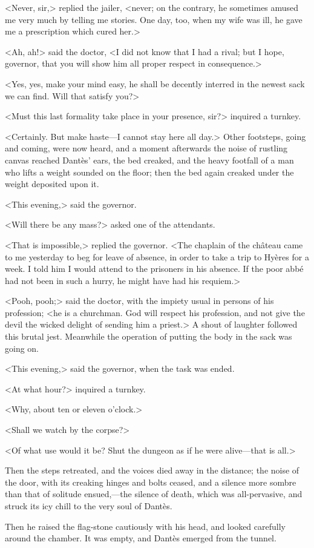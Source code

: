  <Never, sir,> replied the jailer, <never; on the contrary, he sometimes amused me very much by telling me stories. One day, too, when my wife was ill, he gave me a prescription which cured her.> 

 <Ah, ah!> said the doctor, <I did not know that I had a rival; but I hope, governor, that you will show him all proper respect in consequence.> 

 <Yes, yes, make your mind easy, he shall be decently interred in the newest sack we can find. Will that satisfy you?> 

 <Must this last formality take place in your presence, sir?> inquired a turnkey. 

 <Certainly. But make haste—I cannot stay here all day.> Other footsteps, going and coming, were now heard, and a moment afterwards the noise of rustling canvas reached Dantès' ears, the bed creaked, and the heavy footfall of a man who lifts a weight sounded on the floor; then the bed again creaked under the weight deposited upon it. 

 <This evening,> said the governor. 

 <Will there be any mass?> asked one of the attendants. 

 <That is impossible,> replied the governor. <The chaplain of the château came to me yesterday to beg for leave of absence, in order to take a trip to Hyères for a week. I told him I would attend to the prisoners in his absence. If the poor abbé had not been in such a hurry, he might have had his requiem.> 

 <Pooh, pooh;> said the doctor, with the impiety usual in persons of his profession; <he is a churchman. God will respect his profession, and not give the devil the wicked delight of sending him a priest.> A shout of laughter followed this brutal jest. Meanwhile the operation of putting the body in the sack was going on. 

 <This evening,> said the governor, when the task was ended. 

 <At what hour?> inquired a turnkey. 

 <Why, about ten or eleven o'clock.> 

 <Shall we watch by the corpse?> 

 <Of what use would it be? Shut the dungeon as if he were alive—that is all.> 

 Then the steps retreated, and the voices died away in the distance; the noise of the door, with its creaking hinges and bolts ceased, and a silence more sombre than that of solitude ensued,—the silence of death, which was all-pervasive, and struck its icy chill to the very soul of Dantès. 

 Then he raised the flag-stone cautiously with his head, and looked carefully around the chamber. It was empty, and Dantès emerged from the tunnel. 